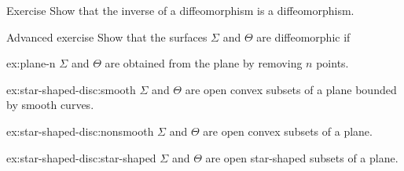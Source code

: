 \begin{thm}{Exercise}\label{ex:inv-diffeomorphism}
Show that the inverse of a diffeomorphism is a diffeomorphism.
\end{thm}

\begin{thm}{Advanced exercise}\label{ex:star-shaped-disc}
Show that the surfaces $\Sigma$ and $\Theta$ are diffeomorphic if

\begin{subthm}{ex:plane-n}
$\Sigma$ and $\Theta$ are obtained from the plane by removing $n$ points.
\end{subthm}


\begin{subthm}{ex:star-shaped-disc:smooth}
$\Sigma$ and $\Theta$ are open convex subsets of a plane bounded by smooth curves.
\end{subthm}


\begin{subthm}{ex:star-shaped-disc:nonsmooth}
$\Sigma$ and $\Theta$ are open convex subsets of a plane.
\end{subthm}

\begin{subthm}{ex:star-shaped-disc:star-shaped}
$\Sigma$ and $\Theta$ are open star-shaped subsets of a plane.
\end{subthm}
\end{thm}

